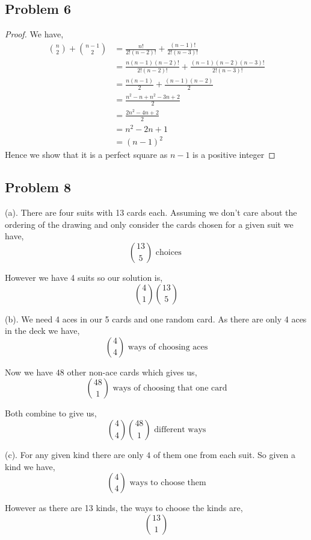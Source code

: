 \documentclass[a4paper]{report}
\begin{document}
\subsection*{Problem 6}
\begin{proof}
    
We have, 
\begin{align*}
    {n \choose 2} + {n-1 \choose 2} &= \frac{n!}{2!(n-2)!} + \frac{(n-1)!}{2!(n-3)!}\\
                                    &= \frac{n(n-1)(n-2)!}{2!(n-2)!} + \frac{(n-1)(n-2)(n-3)!}{2!(n-3)!}\\
                                    &= \frac{n(n-1)}{2} + \frac{(n-1)(n-2)}{2}\\
                                    &= \frac{n^2 - n + n^2 -3n  + 2}{2}\\
                                    &= \frac{2n^2 - 4n + 2}{2}\\
                                    &= {n^2 - 2n + 1}\\
                                    &= (n-1)^2
\end{align*}
Hence we show that it is a perfect square as $n-1$ is a positive integer

\end{proof}


\subsection*{Problem 8}
(a). There are four suits with 13 cards each. Assuming we don't care about the ordering of the drawing and only consider the cards chosen for a given suit we have,
$$ {13 \choose 5} \text { choices }$$ 

However we have 4 suits so our solution is, 
$$ {4 \choose 1} {13 \choose 5} $$ 

(b). We need 4 aces in our 5 cards and one random card. As there are only 4 aces in the deck we have, 
$$ {4 \choose 4} \text{ ways of choosing aces} $$ 

Now we have $48$ other non-ace cards which gives us, 
$$ {48 \choose 1} \text{ ways of choosing that one card} $$ 

Both combine to give us,  
$$ {4 \choose 4} {48 \choose 1} \text{ different ways}$$
    
(c).
For any given kind there are only $4$ of them one from each suit. So given a kind we have, 
$$ {4 \choose 4} \text{ ways to choose them}$$  

However as there are 13 kinds, the ways to choose the kinds are, 
$$ {13 \choose 1} $$ 
\end{document}
